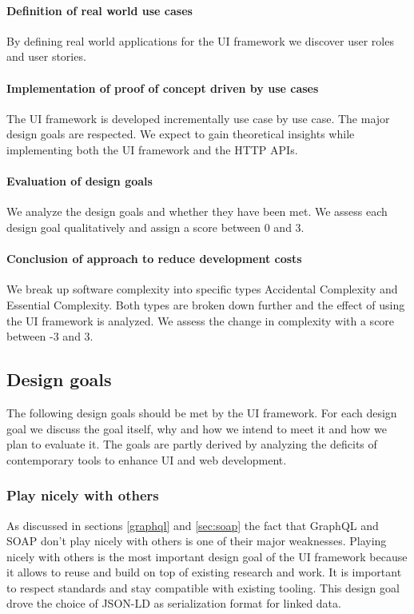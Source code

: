 \paragraph{Definition of real world use cases}
By defining real world applications for the UI framework we discover user roles and user stories.

\paragraph{Implementation of proof of concept driven by use cases}
The UI framework is developed incrementally use case by use case. The major design goals are respected. We expect to gain theoretical insights while implementing both the UI framework and the HTTP APIs.

\paragraph{Evaluation of design goals}
We analyze the design goals and whether they have been met. We assess each design goal qualitatively and assign a score between 0 and 3.

\paragraph{Conclusion of approach to reduce development costs}
We break up software complexity into specific types Accidental Complexity and Essential Complexity. Both types are broken down further and the effect of using the UI framework is analyzed. We assess the change in complexity with a score between -3 and 3.

\subsection{Design goals}\label{sec:designgoals}
The following design goals should be met by the UI framework. For each design goal we discuss the goal itself, why and how we intend to meet it and how we plan to evaluate it.
The goals are partly derived by analyzing the deficits of contemporary tools to enhance UI and web development.

\subsubsection{Play nicely with others}\label{sec:playnice}
As discussed in sections \ref{graphql} and \ref{sec:soap} the fact that GraphQL and SOAP don't play nicely with others is one of their major weaknesses. Playing nicely with others is the most important design goal of the UI framework because it allows to reuse and build on top of existing research and work.
It is important to respect standards and stay compatible with existing tooling. This design goal drove the choice of JSON-LD as serialization format for linked data.


